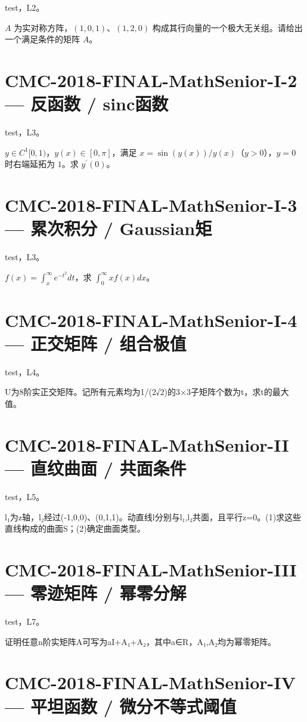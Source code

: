 \documentclass[UTF8]{ctexart}
\begin{document}
test，L2。

$A$ 为实对称方阵，$(1,0,1)$、$(1,2,0)$ 构成其行向量的一个极大无关组。请给出一个满足条件的矩阵 $A$。

\section*{CMC-2018-FINAL-MathSenior-I-2 — 反函数 / sinc函数}

test，L3。

$y\in C^1[0,1)$，$y(x)\in[0,\pi]$，满足 $x=\sin(y(x))/y(x)$（$y>0$），$y=0$ 时右端延拓为 $1$。求 $y^{\prime}(0)$。

\section*{CMC-2018-FINAL-MathSenior-I-3 — 累次积分 / Gaussian矩}

test，L3。

$f(x)=\int_x^\infty e^{-t^2}dt$，求 $\int_0^\infty xf(x)dx$。

\section*{CMC-2018-FINAL-MathSenior-I-4 — 正交矩阵 / 组合极值}

test，L4。

U为8阶实正交矩阵。记所有元素均为1/(2√2)的3×3子矩阵个数为t，求t的最大值。

\section*{CMC-2018-FINAL-MathSenior-II — 直纹曲面 / 共面条件}

test，L5。

l₁为z轴，l₂经过(-1,0,0)、(0,1,1)。动直线l分别与l₁,l₂共面，且平行z=0。(1)求这些直线构成的曲面S；(2)确定曲面类型。

\section*{CMC-2018-FINAL-MathSenior-III — 零迹矩阵 / 幂零分解}

test，L7。

证明任意n阶实矩阵A可写为aI+A₁+A₂，其中a∈R，A₁,A₂均为幂零矩阵。

\section*{CMC-2018-FINAL-MathSenior-IV — 平坦函数 / 微分不等式阈值}
\end{document}
